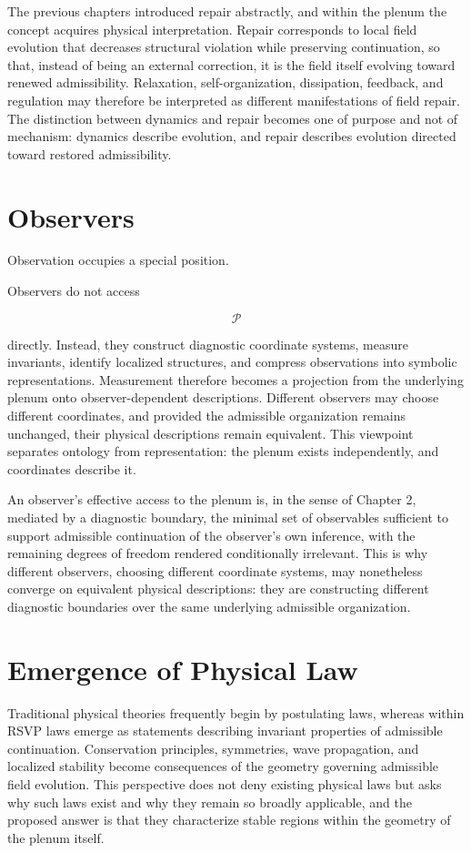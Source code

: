 \documentclass[11pt,oneside]{book}
\numberwithin{equation}{chapter}
\theoremstyle{definition}
\theoremstyle{plain}
\begin{document}
The previous chapters introduced repair abstractly, and within the plenum the concept acquires physical interpretation. Repair corresponds to local field evolution that decreases structural violation while preserving continuation, so that, instead of being an external correction, it is the field itself evolving toward renewed admissibility. Relaxation, self-organization, dissipation, feedback, and regulation may therefore be interpreted as different manifestations of field repair. The distinction between dynamics and repair becomes one of purpose and not of mechanism: dynamics describe evolution, and repair describes evolution directed toward restored admissibility.

\section{Observers}

Observation occupies a special position.

Observers do not access

\[
\mathcal P
\]

directly. Instead, they construct diagnostic coordinate systems, measure invariants, identify localized structures, and compress observations into symbolic representations. Measurement therefore becomes a projection from the underlying plenum onto observer-dependent descriptions. Different observers may choose different coordinates, and provided the admissible organization remains unchanged, their physical descriptions remain equivalent. This viewpoint separates ontology from representation: the plenum exists independently, and coordinates describe it.

An observer's effective access to the plenum is, in the sense of Chapter 2, mediated by a diagnostic boundary, the minimal set of observables sufficient to support admissible continuation of the observer's own inference, with the remaining degrees of freedom rendered conditionally irrelevant. This is why different observers, choosing different coordinate systems, may nonetheless converge on equivalent physical descriptions: they are constructing different diagnostic boundaries over the same underlying admissible organization.

\section{Emergence of Physical Law}

Traditional physical theories frequently begin by postulating laws, whereas within RSVP laws emerge as statements describing invariant properties of admissible continuation. Conservation principles, symmetries, wave propagation, and localized stability become consequences of the geometry governing admissible field evolution. This perspective does not deny existing physical laws but asks why such laws exist and why they remain so broadly applicable, and the proposed answer is that they characterize stable regions within the geometry of the plenum itself.
\end{document}
